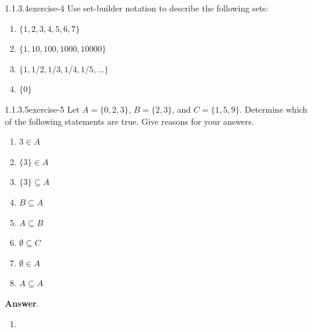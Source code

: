 \documentclass[twoside,10pt,]{book}
\numberwithin{equation}{section}
\begin{document}
\begin{divisionsolution}{1.1.3.4}{}{exercise-4}%
\hypertarget{p-209}{}%
Use set-builder notation to describe the following sets:\leavevmode%
\begin{enumerate}[label=(\alph*)]
\item\hypertarget{li-171}{}\hypertarget{p-210}{}%
\(\{1, 2, 3, 4, 5, 6, 7\}\)%
\item\hypertarget{li-172}{}\hypertarget{p-211}{}%
\(\{1, 10, 100, 1000, 10000\}\)%
\item\hypertarget{li-173}{}\hypertarget{p-212}{}%
\(\{1, 1/2, 1/3, 1/4, 1/5, . . .\}\)%
\item\hypertarget{li-174}{}\hypertarget{p-213}{}%
\(\{0\}\)%
\end{enumerate}
%
\end{divisionsolution}%
\begin{divisionsolution}{1.1.3.5}{}{exercise-5}%
\hypertarget{p-214}{}%
Let \(A = \{0, 2, 3\}\), \(B = \{2, 3\}\), and \(C = \{1, 5, 9\}\). Determine which of the following statements are true. Give reasons for your answers.%
\par
\hypertarget{p-215}{}%
\leavevmode%
\begin{multicols}{2}
\begin{enumerate}[label=(\alph*)]
\item\hypertarget{li-175}{}\hypertarget{p-216}{}%
\(3 \in  A\)%
\item\hypertarget{li-176}{}\hypertarget{p-217}{}%
\(\{3\} \in  A\)%
\item\hypertarget{li-177}{}\hypertarget{p-218}{}%
\(\{3\} \subseteq A\)%
\item\hypertarget{li-178}{}\hypertarget{p-219}{}%
\(B\subseteq A\)%
\item\hypertarget{li-179}{}\hypertarget{p-220}{}%
\(A\subseteq B\)%
\item\hypertarget{li-180}{}\hypertarget{p-221}{}%
\(\emptyset \subseteq C\)%
\item\hypertarget{li-181}{}\hypertarget{p-222}{}%
\(\emptyset \in A\)%
\item\hypertarget{li-182}{}\hypertarget{p-223}{}%
\(A\subseteq A\)%
\end{enumerate}
\end{multicols}
%
\par\smallskip%
\noindent\textbf{Answer}.\quad%
\hypertarget{p-224}{}%
\leavevmode%
\begin{multicols}{3}
\begin{enumerate}[label=(\alph*)]
\item\hypertarget{li-183}{}\hypertarget{p-225}{}%

\end{enumerate}
\end{multicols}
\end{divisionsolution}
\end{document}
